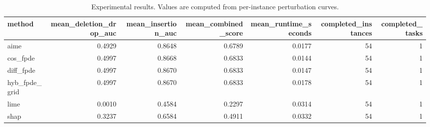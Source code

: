 \begin{table}[t]
\caption{Experimental results. Values are computed from per-instance perturbation curves.}
\label{tab:main_results_computed}
\centering
\begin{tabular}{lrrrrrr}
\toprule
method & mean\_deletion\_drop\_auc & mean\_insertion\_auc & mean\_combined\_score & mean\_runtime\_seconds & completed\_instances & completed\_tasks \\
\midrule
aime & 0.4929 & 0.8648 & 0.6789 & 0.0177 & 54 & 1 \\
cos\_fpde & 0.4997 & 0.8668 & 0.6833 & 0.0144 & 54 & 1 \\
diff\_fpde & 0.4997 & 0.8670 & 0.6833 & 0.0147 & 54 & 1 \\
hyb\_fpde\_grid & 0.4997 & 0.8670 & 0.6833 & 0.0178 & 54 & 1 \\
lime & 0.0010 & 0.4584 & 0.2297 & 0.0314 & 54 & 1 \\
shap & 0.3237 & 0.6584 & 0.4911 & 0.0332 & 54 & 1 \\
\bottomrule
\end{tabular}

\end{table}
